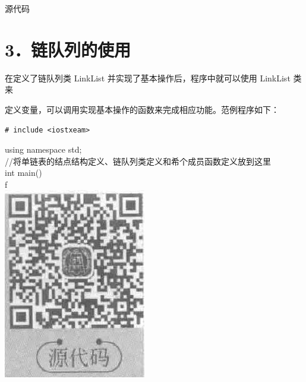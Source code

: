 \documentclass[10pt]{article}
\begin{document}
源代码

\section*{3．链队列的使用}
在定义了链队列类 LinkList 并实现了基本操作后，程序中就可以使用 LinkList 类来

定义变量，可以调用实现基本操作的函数来完成相应功能。范例程序如下：

\begin{verbatim}
# include <iostxeam>
\end{verbatim}

using namespace std;\\
//将单链表的结点结构定义、链队列类定义和希个成员函数定义放到这里\\
int main()\\
f\\
\includegraphics[max width=\textwidth, center]{2025_06_06_704745ea57b15b2333e5g-099}\\
\end{document}

